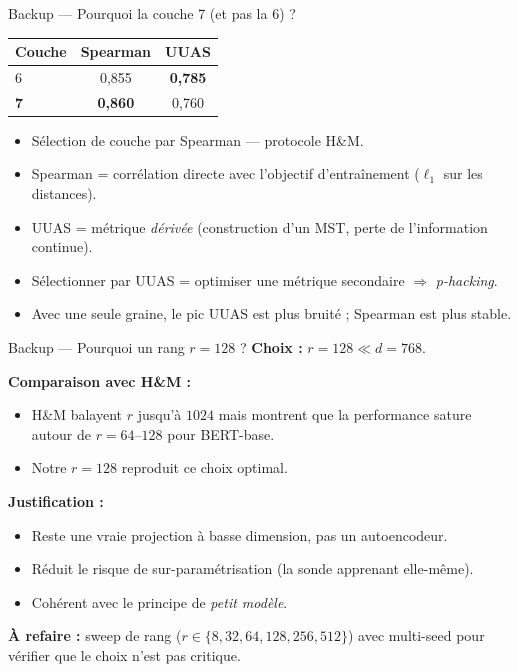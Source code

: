 \documentclass[aspectratio=169,11pt]{beamer}
\begin{document}
\begin{frame}{Backup --- Pourquoi la couche 7 (et pas la 6) ?}
  \centering
  \begin{tabular}{lcc}
    \toprule
    Couche & Spearman & UUAS \\
    \midrule
    6           & 0{,}855          & \textbf{0{,}785} \\
    \textbf{7}  & \textbf{0{,}860} & 0{,}760 \\
    \bottomrule
  \end{tabular}

  \vspace{0.5cm}
  \begin{itemize}\setlength\itemsep{3pt}
    \item Sélection de couche par \alert{Spearman} --- protocole H\&M.
    \item Spearman = corrélation directe avec l'objectif d'entraînement
          ($\ell_1$ sur les distances).
    \item UUAS = métrique \emph{dérivée} (construction d'un MST, perte
          de l'information continue).
    \item Sélectionner par UUAS = optimiser une métrique secondaire $\Rightarrow$ \emph{p-hacking}.
    \item Avec une seule graine, le pic UUAS est plus bruité ;
          Spearman est plus stable.
  \end{itemize}
\end{frame}

\begin{frame}{Backup --- Pourquoi un rang $r = 128$ ?}
  \textbf{Choix :} $r = 128 \ll d = 768$.

  \medskip
  \textbf{Comparaison avec H\&M :}
  \begin{itemize}\setlength\itemsep{2pt}
    \item H\&M balayent $r$ jusqu'à $1024$ mais montrent que la
          performance \alert{sature autour de $r = 64$--$128$} pour BERT-base.
    \item Notre $r = 128$ reproduit ce choix optimal.
  \end{itemize}

  \medskip
  \textbf{Justification :}
  \begin{itemize}\setlength\itemsep{2pt}
    \item Reste une vraie projection à basse dimension, pas un autoencodeur.
    \item Réduit le risque de sur-paramétrisation (la sonde apprenant elle-même).
    \item Cohérent avec le principe de \emph{petit modèle}.
  \end{itemize}

  \medskip
  \textbf{À refaire :} sweep de rang ($r \in \{8, 32, 64, 128, 256, 512\}$)
  avec multi-seed pour vérifier que le choix n'est pas critique.
\end{frame}
\end{document}
